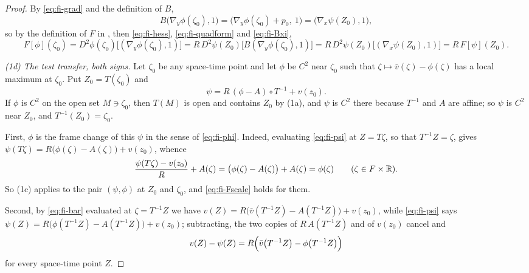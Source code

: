 \begin{proof}
By \eqref{eq:fi-grad} and the definition of $B$,
\begin{equation}\label{eq:fi-Bxi}
  B\bigl(\nabla_y\phi(\zeta_0),1\bigr)
   =\bigl(\nabla_y\phi(\zeta_0)+p_0,\ 1\bigr)
   =\bigl(\nabla_x\psi(Z_0),1\bigr),
\end{equation}
so by the definition of $F$ in , then \eqref{eq:fi-hess},
\eqref{eq:fi-quadform} and \eqref{eq:fi-Bxi},
\begin{equation}\label{eq:fi-Fscale}
  F[\phi](\zeta_0)=D^2\phi(\zeta_0)\bigl[(\nabla_y\phi(\zeta_0),1)\bigr]
   =R\,D^2\psi(Z_0)\bigl[B(\nabla_y\phi(\zeta_0),1)\bigr]
   =R\,D^2\psi(Z_0)\bigl[(\nabla_x\psi(Z_0),1)\bigr]
   =R\,F[\psi](Z_0).
\end{equation}

\emph{(1d) The test transfer, both signs.}
Let $\zeta_0$ be any space-time point and let $\phi$ be $C^2$ near $\zeta_0$
such that $\zeta\mapsto\bar v(\zeta)-\phi(\zeta)$ has a local maximum at
$\zeta_0$. Put $Z_0=T(\zeta_0)$ and
\begin{equation}\label{eq:fi-psi}
  \psi=R\,(\phi-A)\circ T^{-1}+v(z_0).
\end{equation}
If $\phi$ is $C^2$ on the open set $M\ni\zeta_0$, then $T(M)$ is open and
contains $Z_0$ by (1a), and $\psi$ is $C^2$ there because $T^{-1}$ and $A$ are
affine; so $\psi$ is $C^2$ near $Z_0$, and $T^{-1}(Z_0)=\zeta_0$.

First, $\phi$ is the frame change of this $\psi$ in the sense of
\eqref{eq:fi-phi}. Indeed, evaluating \eqref{eq:fi-psi} at $Z=T\zeta$, so that
$T^{-1}Z=\zeta$, gives $\psi(T\zeta)=R\bigl(\phi(\zeta)-A(\zeta)\bigr)+v(z_0)$,
whence
\[
  \frac{\psi(T\zeta)-v(z_0)}R+A(\zeta)
   =\bigl(\phi(\zeta)-A(\zeta)\bigr)+A(\zeta)=\phi(\zeta)
   \qquad(\zeta\in F\times\mathbb{R}).
\]
So (1c) applies to the pair $(\psi,\phi)$ at $Z_0$ and $\zeta_0$, and
\eqref{eq:fi-Fscale} holds for them.

Second, by \eqref{eq:fi-bar} evaluated at $\zeta=T^{-1}Z$ we have
$v(Z)=R\bigl(\bar v(T^{-1}Z)-A(T^{-1}Z)\bigr)+v(z_0)$, while
\eqref{eq:fi-psi} says $\psi(Z)=R\bigl(\phi(T^{-1}Z)-A(T^{-1}Z)\bigr)+v(z_0)$;
subtracting, the two copies of $R\,A(T^{-1}Z)$ and of $v(z_0)$ cancel and
\begin{equation}\label{eq:fi-diff}
  v(Z)-\psi(Z)=R\Bigl(\bar v\bigl(T^{-1}Z\bigr)-\phi\bigl(T^{-1}Z\bigr)\Bigr)
\end{equation}
for every space-time point $Z$.


\end{proof}
